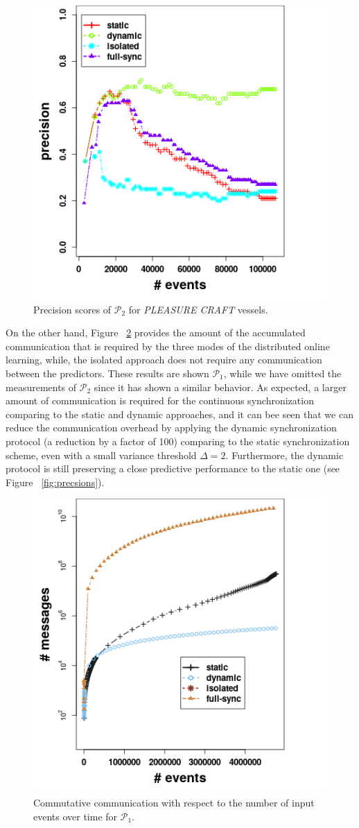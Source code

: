  \begin{figure}[h]
 	
 	\includegraphics[width=.5\textwidth]{figures/precision_p2.png}
 	
 	\caption{Precision scores of $\mathcal{P}_2$  for \textit{PLEASURE CRAFT} vessels.}
 	\label{fig:precsions_p2}
 \end{figure}
 
 
\par On the other hand, Figure ~\ref{fig:comm} provides the amount of the accumulated communication that is required by the three modes of the distributed online learning, while, the isolated approach does not require any communication between the predictors. These results are shown  $\mathcal{P}_1$, while we have omitted the measurements of  $\mathcal{P}_2$ since it has shown a similar behavior.  As expected, a larger amount of communication is required for the continuous synchronization comparing to the static and dynamic approaches, and it can bee seen that we can reduce the communication overhead by applying the dynamic synchronization protocol (a reduction by a factor of 100) comparing to the static synchronization scheme, even with a small variance threshold $\Delta=2$. Furthermore,  the dynamic  protocol is still preserving a close predictive performance to the static one (see Figure ~\ref{fig:precsions}).    


\begin{center}
	
	\begin{figure}[h]
		
		\includegraphics[width=.5\textwidth]{figures/communication.png}
		
		\caption{Commutative communication with respect to the number of input events over time for $\mathcal{P}_1$.}
		\label{fig:comm}
	\end{figure}
\end{center}

